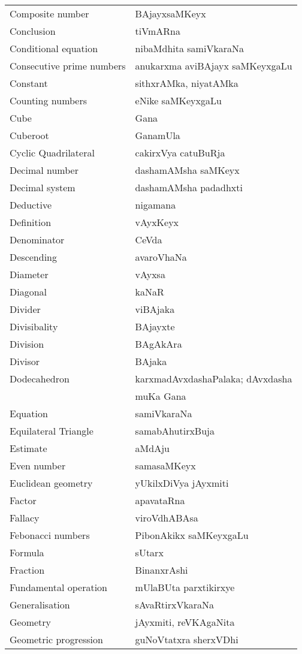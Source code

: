 {\begin{longtable}{>{\rm}l@{\hspace{1cm}}l}
Composite number & BAjayxsaMKeyx\\
Conclusion & tiVmARna\\
Conditional equation & nibaMdhita samiVkaraNa\\
Consecutive prime numbers & anukarxma aviBAjayx saMKeyxgaLu\\
Constant & sithxrAMka, niyatAMka\\
Counting numbers & eNike saMKeyxgaLu\\
Cube & Gana\\
Cuberoot & GanamUla\\
Cyclic Quadrilateral & cakirxVya catuBuRja\\
Decimal number & dashamAMsha saMKeyx\\
Decimal system & dashamAMsha padadhxti\\
Deductive & nigamana\\
Definition & vAyxKeyx\\
Denominator & CeVda\\
Descending & avaroVhaNa\\
Diameter & vAyxsa\\
Diagonal & kaNaR\\
Divider & viBAjaka\\
Divisibality & BAjayxte\\
Division & BAgAkAra\\
Divisor & BAjaka\\
Dodecahedron & karxmadAvxdashaPalaka; dAvxdasha\\[-0.1cm]
& muKa Gana\\
Equation & samiVkaraNa\\
Equilateral Triangle & samabAhutirxBuja\\
Estimate & aMdAju\\
Even number & samasaMKeyx\\
Euclidean geometry & yUkilxDiVya jAyxmiti\\
Factor & apavataRna\\
Fallacy & viroVdhABAsa\\
Febonacci numbers & PibonAkikx saMKeyxgaLu\\
Formula & sUtarx\\
Fraction & BinanxrAshi\\
Fundamental operation & mUlaBUta parxtikirxye\\
Generalisation & sAvaRtirxVkaraNa\\
Geometry & jAyxmiti, reVKAgaNita\\
Geometric progression & guNoVtatxra sherxVDhi\\

\end{longtable}}
